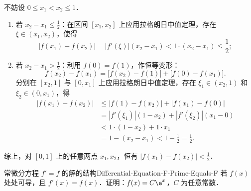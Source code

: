 \begin{myproof}
    不妨设 $0 \leqslant x_1 < x_2 \leqslant 1$．
    \begin{enumerate}
        \item 若 $x_2 - x_1 \leqslant \frac{1}{2}$：在区间 $[x_1, x_2]$ 上应用拉格朗日中值定理，存在 $\xi \in (x_1, x_2)$，使得
              \begin{equation}
                  |f(x_1) - f(x_2)| = |f'(\xi)| (x_2 - x_1) < 1 \cdot (x_2 - x_1) \leqslant \frac{1}{2};
              \end{equation}
        \item 若 $x_2 - x_1 > \frac{1}{2}$：利用 $f(0) = f(1)$，作恒等变形：
              \begin{equation}
                  f(x_2) - f(x_1) = \bigl[ f(x_2) - f(1) \bigr] + \bigl[ f(0) - f(x_1) \bigr].
              \end{equation}
              分别在 $[x_2, 1]$ 与 $[0, x_1]$ 上应用拉格朗日中值定理，存在 $\xi_1 \in (x_2, 1)$ 和 $\xi_2 \in (0, x_1)$，得
              \begin{equation}
                  \begin{aligned}
                      |f(x_1) - f(x_2)| & \leqslant |f(1) - f(x_2)| + |f(x_1) - f(0)|        \\
                                        & = |f'(\xi_1)|(1 - x_2) + |f'(\xi_2)|(x_1 - 0)      \\
                                        & < 1 \cdot (1 - x_2) + 1 \cdot x_1                  \\
                                        & = 1 - (x_2 - x_1) < 1 - \frac{1}{2} = \frac{1}{2}.
                  \end{aligned}
              \end{equation}
    \end{enumerate}
    综上，对 $[0, 1]$ 上的任意两点 $x_1, x_2$，恒有 $|f(x_1) - f(x_2)| < \frac{1}{2}$．
\end{myproof}

\begin{problem}{常微分方程 $f'=f$ 的解的结构}{Differential-Equation-F-Prime-Equals-F}
    若 $f(x)$ 处处可导，且 $f'(x) = f(x)$．证明：$f(x) = C\e^x$，$C$ 为任意常数．
\end{problem}


